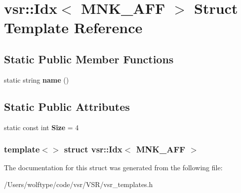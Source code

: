 \hypertarget{structvsr_1_1_idx_3_01_m_n_k___a_f_f_01_4}{\section{vsr\-:\-:Idx$<$ M\-N\-K\-\_\-\-A\-F\-F $>$ Struct Template Reference}
\label{structvsr_1_1_idx_3_01_m_n_k___a_f_f_01_4}
}
\subsection*{Static Public Member Functions}
\begin{DoxyCompactItemize}
\item 
\hypertarget{structvsr_1_1_idx_3_01_m_n_k___a_f_f_01_4_a867e548f5816d792f5d34ab5c0c033a5}{static string {\bfseries name} ()}\label{structvsr_1_1_idx_3_01_m_n_k___a_f_f_01_4_a867e548f5816d792f5d34ab5c0c033a5}

\end{DoxyCompactItemize}
\subsection*{Static Public Attributes}
\begin{DoxyCompactItemize}
\item 
\hypertarget{structvsr_1_1_idx_3_01_m_n_k___a_f_f_01_4_aecf39ac293fc1385b05e73144cde3889}{static const int {\bfseries Size} = 4}\label{structvsr_1_1_idx_3_01_m_n_k___a_f_f_01_4_aecf39ac293fc1385b05e73144cde3889}

\end{DoxyCompactItemize}
\subsubsection*{template$<$$>$ struct vsr\-::\-Idx$<$ M\-N\-K\-\_\-\-A\-F\-F $>$}



The documentation for this struct was generated from the following file\-:\begin{DoxyCompactItemize}
\item 
/\-Users/wolftype/code/vsr/\-V\-S\-R/vsr\-\_\-templates.\-h\end{DoxyCompactItemize}
